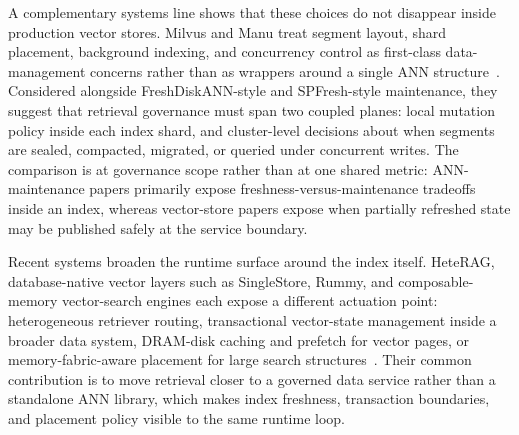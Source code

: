 \documentclass[acmsmall,screen,review]{acmart}
\begin{document}
A complementary systems line shows that these choices do not disappear inside production vector stores. Milvus and Manu treat segment layout, shard placement, background indexing, and concurrency control as first-class data-management concerns rather than as wrappers around a single ANN structure~\cite{wang2021milvus,guo2022manu}. Considered alongside FreshDiskANN-style and SPFresh-style maintenance, they suggest that retrieval governance must span two coupled planes: local mutation policy inside each index shard, and cluster-level decisions about when segments are sealed, compacted, migrated, or queried under concurrent writes. The comparison is at governance scope rather than at one shared metric: ANN-maintenance papers primarily expose freshness-versus-maintenance tradeoffs inside an index, whereas vector-store papers expose when partially refreshed state may be published safely at the service boundary.

Recent systems broaden the runtime surface around the index itself. HeteRAG, database-native vector layers such as SingleStore, Rummy, and composable-memory vector-search engines each expose a different actuation point: heterogeneous retriever routing, transactional vector-state management inside a broader data system, DRAM-disk caching and prefetch for vector pages, or memory-fabric-aware placement for large search structures~\cite{liu2025heterrag,chen2024singlestorev,zhang2024rummy,quinn2025accelerating}. Their common contribution is to move retrieval closer to a governed data service rather than a standalone ANN library, which makes index freshness, transaction boundaries, and placement policy visible to the same runtime loop.
\end{document}
